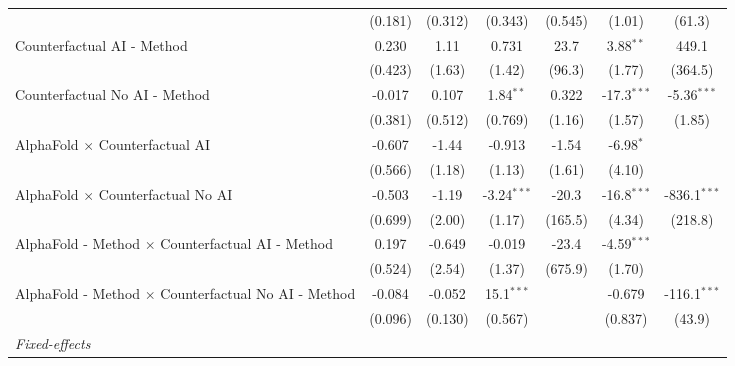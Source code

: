 \begin{tabular}{lcccccc}
                                                              & (0.181)       & (0.312)      & (0.343)       & (0.545)      & (1.01)        & (61.3)\\   
   Counterfactual AI - Method                                 & 0.230         & 1.11         & 0.731         & 23.7         & 3.88$^{**}$   & 449.1\\   
                                                              & (0.423)       & (1.63)       & (1.42)        & (96.3)       & (1.77)        & (364.5)\\   
   Counterfactual No AI - Method                              & -0.017        & 0.107        & 1.84$^{**}$   & 0.322        & -17.3$^{***}$ & -5.36$^{***}$\\   
                                                              & (0.381)       & (0.512)      & (0.769)       & (1.16)       & (1.57)        & (1.85)\\   
   AlphaFold $\times$ Counterfactual AI                       & -0.607        & -1.44        & -0.913        & -1.54        & -6.98$^{*}$   &   \\   
                                                              & (0.566)       & (1.18)       & (1.13)        & (1.61)       & (4.10)        &   \\   
   AlphaFold $\times$ Counterfactual No AI                    & -0.503        & -1.19        & -3.24$^{***}$ & -20.3        & -16.8$^{***}$ & -836.1$^{***}$\\   
                                                              & (0.699)       & (2.00)       & (1.17)        & (165.5)      & (4.34)        & (218.8)\\   
   AlphaFold - Method $\times$ Counterfactual AI - Method     & 0.197         & -0.649       & -0.019        & -23.4        & -4.59$^{***}$ &   \\   
                                                              & (0.524)       & (2.54)       & (1.37)        & (675.9)      & (1.70)        &   \\   
   AlphaFold - Method $\times$ Counterfactual No AI - Method  & -0.084        & -0.052       & 15.1$^{***}$  &              & -0.679        & -116.1$^{***}$\\   
                                                              & (0.096)       & (0.130)      & (0.567)       &              & (0.837)       & (43.9)\\   
   \midrule
   \emph{Fixed-effects}\\

\end{tabular}
